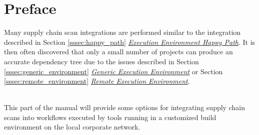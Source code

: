 
\section*{Preface}

Many supply chain scan integrations are performed similar to the integration
described in Section \ref{sssec:happy_path}
\hyperref[sssec:happy_path]{\textit{Execution Environment Happy Path}}. It
is then often discovered that only a small number of projects can produce
an accurate dependency tree due to the issues described in Section
\ref{sssec:generic_environment}
\hyperref[sssec:generic_environment]{\textit{Generic Execution Environment}} or
Section \ref{sssec:remote_environment}
\hyperref[sssec:remote_environment]{\textit{Remote Execution Environment}}.

\noindent\\This part of the manual will provide some options for integrating
supply chain scans into workflows executed by tools running
in a customized build environment on the local corporate network.






